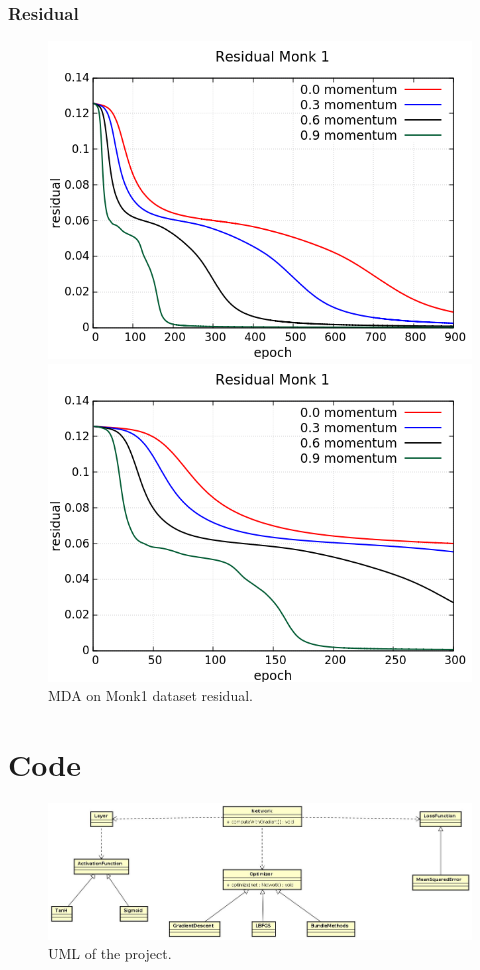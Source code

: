 \subsubsection{Residual}
\begin{figure}[H]
	\centering
	\begin{minipage}[t]{0.5\linewidth}
		\includegraphics[width=\linewidth]{data/MGD/Monk1/M/Monk1_MGD_Residual_standard.png}
	\end{minipage}%
	\begin{minipage}[t]{0.5\linewidth}
		\includegraphics[width=\linewidth]{data/MGD/Monk1/M/Monk1_MGD_Residual_zoom.png}
	\end{minipage}
	\caption{MDA on Monk1 dataset residual.}
\end{figure}

\section{Code}
\begin{figure}[H]
	\centering
	\includegraphics[width=\linewidth]{img/uml.jpg}
	\caption{UML of the project.}
\end{figure}
\newpage